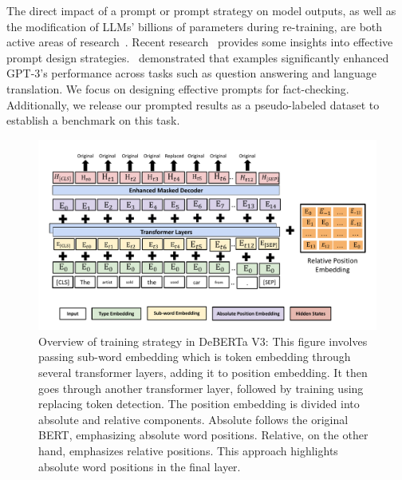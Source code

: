 The direct impact of a prompt or prompt strategy on model outputs, as well as the modification of LLMs' billions of parameters during re-training, are both active areas of research~\cite{liu2021pretrain,sanh2022multitask}. Recent research~\cite{xing2023prompt,white2023prompt,lian2023llmgrounded} provides some insights into effective prompt design strategies.~\citet{brown2020language} demonstrated that examples significantly enhanced GPT-3's performance across tasks such as question answering and language translation. We focus on designing effective prompts for fact-checking. Additionally, we release our prompted results as a pseudo-labeled dataset to establish a benchmark on this task.

\begin{figure}
  \centering
\includegraphics[width=\textwidth,height=\textwidth,keepaspectratio]{images/deberta.pdf}
  \caption{Overview of training strategy in DeBERTa V3: This figure involves passing sub-word embedding which is token embedding through several transformer layers, adding it to position embedding. It then goes through another transformer layer, followed by training using replacing token detection. The position embedding is divided into absolute and relative components. Absolute follows the original BERT, emphasizing absolute word positions. Relative, on the other hand, emphasizes relative positions. This approach highlights absolute word positions in the final layer.}
  \label{fig:deberta}
\end{figure}